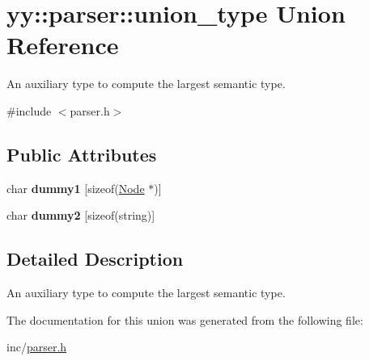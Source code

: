 \hypertarget{unionyy_1_1parser_1_1union__type}{}\section{yy\+:\+:parser\+:\+:union\+\_\+type Union Reference}
\label{unionyy_1_1parser_1_1union__type}


An auxiliary type to compute the largest semantic type.  




{\ttfamily \#include $<$parser.\+h$>$}

\subsection*{Public Attributes}
\begin{DoxyCompactItemize}
\item 
\hypertarget{unionyy_1_1parser_1_1union__type_a0db9b7b9325335136722f9966c455746}{}char {\bfseries dummy1} \mbox{[}sizeof(\hyperlink{classNode}{Node} $\ast$)\mbox{]}\label{unionyy_1_1parser_1_1union__type_a0db9b7b9325335136722f9966c455746}

\item 
\hypertarget{unionyy_1_1parser_1_1union__type_a77671989075b3b4f942b9d82ccc645c8}{}char {\bfseries dummy2} \mbox{[}sizeof(string)\mbox{]}\label{unionyy_1_1parser_1_1union__type_a77671989075b3b4f942b9d82ccc645c8}

\end{DoxyCompactItemize}


\subsection{Detailed Description}
An auxiliary type to compute the largest semantic type. 

The documentation for this union was generated from the following file\+:\begin{DoxyCompactItemize}
\item 
inc/\hyperlink{parser_8h}{parser.\+h}\end{DoxyCompactItemize}
